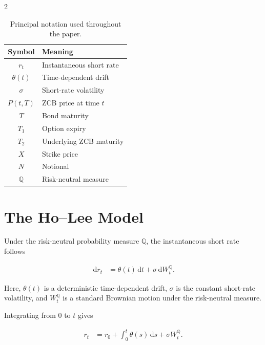 \documentclass[10pt,a4paper]{article}
\newcommand{\Q}{\mathbb{Q}}
\newcommand{\dd}{\,\mathrm{d}}
\numberwithin{equation}{section}
\begin{document}
\begin{multicols}{2}
\begin{table}[H]
    \caption{
        Principal notation used throughout the paper.
    }
    \label{tab:notation}

    \small
    \renewcommand{\arraystretch}{1.15}

    \begin{tabular}{cl}
        \toprule
        \textbf{Symbol}
        &
        \textbf{Meaning}
        \\
        \midrule
        $r_t$
        & Instantaneous short rate \\
        $\theta(t)$
        & Time-dependent drift \\
        $\sigma$
        & Short-rate volatility \\
        $P(t,T)$
        & ZCB price at time $t$ \\
        $T$
        & Bond maturity \\
        $T_1$
        & Option expiry \\
        $T_2$
        & Underlying ZCB maturity \\
        $X$
        & Strike price \\
        $N$
        & Notional \\
        $\Q$
        & Risk-neutral measure \\
        \bottomrule
    \end{tabular}
\end{table}

\section{The Ho--Lee Model}

Under the risk-neutral probability measure $\Q$, the instantaneous
short rate follows

\begin{align}
    \dd r_t
    &=
    \theta(t)\dd t
    +
    \sigma\dd W_t^{\Q}.
    \label{eq:ho_lee_sde}
\end{align}

Here, $\theta(t)$ is a deterministic time-dependent drift, $\sigma$ is
the constant short-rate volatility, and $W_t^{\Q}$ is a standard
Brownian motion under the risk-neutral measure.

Integrating  from $0$ to $t$ gives

\begin{align*}
    r_t
    &=
    r_0
    +
    \int_0^t\theta(s)\dd s
    +
    \sigma W_t^{\Q}.
\end{align*}


\end{multicols}
\end{document}

